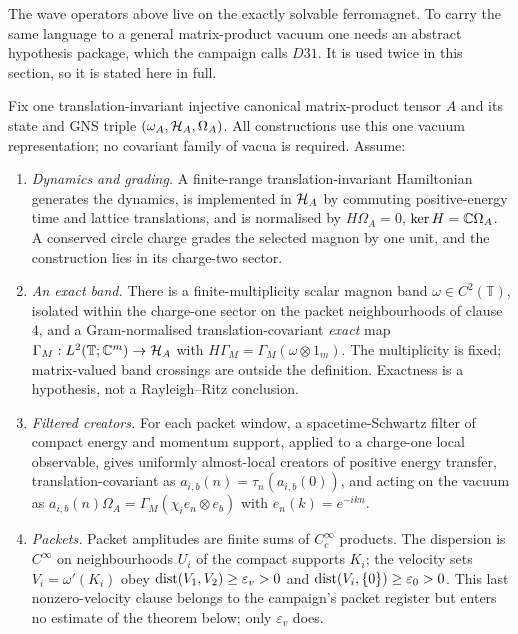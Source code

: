 The wave operators above live on the exactly solvable ferromagnet. To carry
the same language to a general matrix-product vacuum one needs an abstract
hypothesis package, which the campaign calls $D31$. It is used twice in this
section, so it is stated here in full.

\begin{definition}
\label{def:d31}
Fix one translation-invariant injective canonical matrix-product tensor $A$
and its state and GNS triple $(\omega_A,\mathcal{H}_A,\Omega_A)$. All constructions
use this one vacuum representation; no covariant family of vacua is required.
Assume:
\begin{enumerate}
\item \emph{Dynamics and grading.} A finite-range translation-invariant
  Hamiltonian generates the dynamics, is implemented in $\mathcal{H}_A$ by commuting
  positive-energy time and lattice translations, and is normalised by
  $H\Omega_A=0$, $\ker H=\mathbb{C}\Omega_A$. A conserved circle charge grades the
  selected magnon by one unit, and the construction lies in its charge-two
  sector.
\item \emph{An exact band.} There is a finite-multiplicity scalar magnon band
  $\omega\in C^2(\mathbb{T})$, isolated within the charge-one sector on the
  packet neighbourhoods of clause 4, and a Gram-normalised
  translation-covariant \emph{exact} map
  $\Gamma_M:L^2(\mathbb{T};\mathbb{C}^m)\to\mathcal{H}_A$ with
  $H\Gamma_M=\Gamma_M(\omega\otimes1_m)$. The multiplicity is fixed;
  matrix-valued band crossings are outside the definition. Exactness is a
  hypothesis, not a Rayleigh--Ritz conclusion.
\item \emph{Filtered creators.} For each packet window, a spacetime-Schwartz
  filter of compact energy and momentum support, applied to a
  charge-one local observable, gives uniformly almost-local creators of
  positive energy transfer, translation-covariant as
  $a_{i,b}(n)=\tau_n(a_{i,b}(0))$, and acting on the vacuum as
  $a_{i,b}(n)\Omega_A=\Gamma_M(\chi_ie_n\otimes e_b)$ with
  $e_n(k)=e^{-ikn}$.
\item \emph{Packets.} Packet amplitudes are finite sums of $C_c^\infty$
  products. The dispersion is $C^\infty$ on neighbourhoods $U_i$ of the
  compact supports $K_i$; the velocity sets $V_i=\omega'(K_i)$ obey
  $\operatorname{dist}(V_1,V_2)\ge\varepsilon_v>0$ and $\operatorname{dist}(V_i,\{0\})\ge\varepsilon_0>0$.
  This last nonzero-velocity clause belongs to the campaign's packet register
  but enters no estimate of the theorem below; only $\varepsilon_v$ does.

\end{enumerate}
\end{definition}
